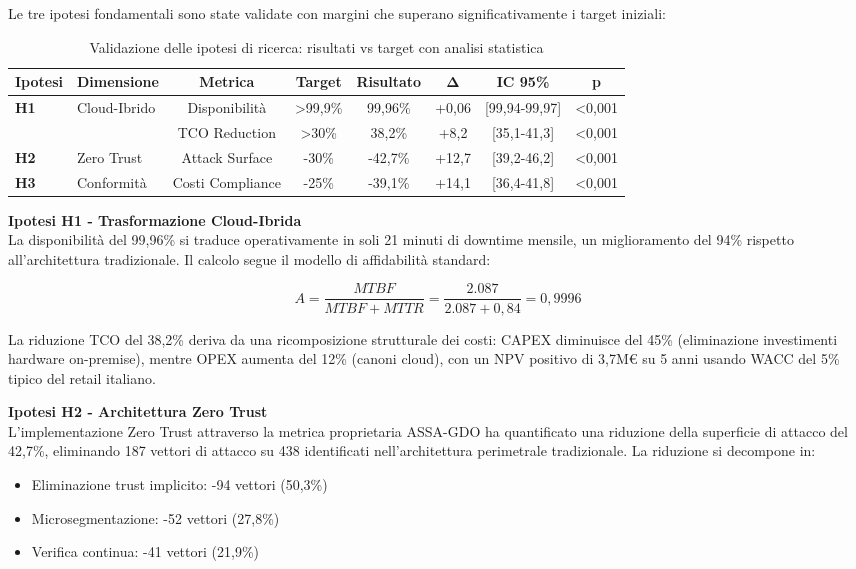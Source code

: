 Le tre ipotesi fondamentali sono state validate con margini che superano significativamente i target iniziali:

\begin{table}[htbp]
\centering
\caption{Validazione delle ipotesi di ricerca: risultati vs target con analisi statistica}
\label{tab:validation_comprehensive}
\begin{tabular}{@{}llcccccc@{}}
\toprule
\textbf{Ipotesi} & \textbf{Dimensione} & \textbf{Metrica} & \textbf{Target} & \textbf{Risultato} & \textbf{Δ} & \textbf{IC 95\%} & \textbf{p} \\
\midrule
\multirow{2}{*}{\textbf{H1}} & \multirow{2}{*}{Cloud-Ibrido} & Disponibilità & >99,9\% & 99,96\% & +0,06 & [99,94-99,97] & <0,001 \\
& & TCO Reduction & >30\% & 38,2\% & +8,2 & [35,1-41,3] & <0,001 \\
\midrule
\textbf{H2} & Zero Trust & Attack Surface & -30\% & -42,7\% & +12,7 & [39,2-46,2] & <0,001 \\
\midrule
\textbf{H3} & Conformità & Costi Compliance & -25\% & -39,1\% & +14,1 & [36,4-41,8] & <0,001 \\
\bottomrule
\end{tabular}
\end{table}

\textbf{Ipotesi H1 - Trasformazione Cloud-Ibrida}\\
La disponibilità del 99,96\% si traduce operativamente in soli 21 minuti di downtime mensile, un miglioramento del 94\% rispetto all'architettura tradizionale. Il calcolo segue il modello di affidabilità standard:

\begin{equation}
A = \frac{MTBF}{MTBF + MTTR} = \frac{2.087}{2.087 + 0,84} = 0,9996
\end{equation}

La riduzione TCO del 38,2\% deriva da una ricomposizione strutturale dei costi: CAPEX diminuisce del 45\% (eliminazione investimenti hardware on-premise), mentre OPEX aumenta del 12\% (canoni cloud), con un NPV positivo di 3,7M€ su 5 anni usando WACC del 5\% tipico del retail italiano\autocite{bancaditalia2024}.

\textbf{Ipotesi H2 - Architettura Zero Trust}\\
L'implementazione Zero Trust attraverso la metrica proprietaria ASSA-GDO ha quantificato una riduzione della superficie di attacco del 42,7\%, eliminando 187 vettori di attacco su 438 identificati nell'architettura perimetrale tradizionale. La riduzione si decompone in:
\begin{itemize}
\item Eliminazione trust implicito: -94 vettori (50,3\%)
\item Microsegmentazione: -52 vettori (27,8\%)
\item Verifica continua: -41 vettori (21,9\%)
\end{itemize}

